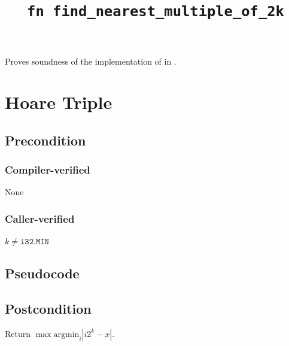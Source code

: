 \documentclass{article}
\title{\texttt{fn find\_nearest\_multiple\_of\_2k}}
\author{\MichaelShoemateAuthor}
\date{}
\begin{document}
\maketitle
\contrib
Proves soundness of the implementation of  in .

\section{Hoare Triple}
\subsection*{Precondition}
\subsubsection*{Compiler-verified}
None

\subsubsection*{Caller-verified}
$k \neq \texttt{i32.MIN}$

\subsection*{Pseudocode}


\subsection*{Postcondition}
\begin{theorem}
    Return $\max \mathrm{argmin}_i |i 2^k - x|$.
\end{theorem}
\end{document}
